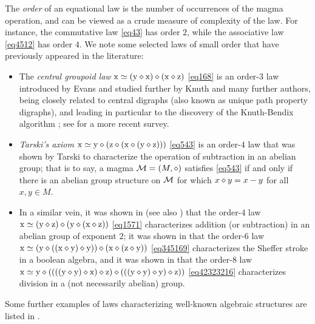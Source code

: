 The \emph{order} of an equational law is the number of occurrences of the magma operation, and can be viewed as a crude measure of complexity of the law. For instance, the commutative law \eqref{eq43} has order $2$, while the associative law \eqref{eq4512} has order $4$. We note some selected laws of small order that have previously appeared in the literature:
\begin{itemize}
\item The \emph{central groupoid law} $\mathrm{x} \simeq (\mathrm{y} \diamond \mathrm{x}) \diamond (\mathrm{x} \diamond \mathrm{z})$ \eqref{eq168} is an order-$3$ law introduced by Evans \cite{evans} and studied further by Knuth \cite{knuth} and many further authors, being closely related to central digraphs (also known as unique path property digraphs), and leading in particular to the discovery of the Knuth-Bendix algorithm \cite{knuth-bendix}; see \cite{klt} for a more recent survey.
\item \emph{Tarski's axiom} $\mathrm{x} \simeq \mathrm{y} \diamond (\mathrm{z} \diamond (\mathrm{x} \diamond (\mathrm{y} \diamond \mathrm{z})))$ \eqref{eq543} is an order-$4$ law that was shown by Tarski \cite{Tarski1938} to characterize the operation of subtraction in an abelian group; that is to say, a magma ${\mathcal{M}} = (M,\diamond)$ satisfies \eqref{eq543} if and only if there is an abelian group structure on ${\mathcal{M}}$ for which $x \diamond y = x-y$ for all $x,y \in M$.
\item In a similar vein, it was shown in \cite{mendelsohn-padmanabhan} (see also \cite{meredith-prior}) that the order-$4$ law
$\mathrm{x} \simeq (\mathrm{y} \diamond \mathrm{z}) \diamond (\mathrm{y} \diamond (\mathrm{x} \diamond \mathrm{z}))$ \eqref{eq1571} characterizes addition (or subtraction) in an abelian group of exponent $2$; it was shown in \cite{mccune_et_al} that the order-$6$ law $\mathrm{x} \simeq (\mathrm{y} \diamond ((\mathrm{x} \diamond \mathrm{y}) \diamond \mathrm{y})) \diamond (\mathrm{x} \diamond (\mathrm{z} \diamond \mathrm{y}))$ \eqref{eq345169} characterizes the Sheffer stroke in a boolean algebra, and it was shown in \cite{higman-neumann} that the order-$8$ law
$\mathrm{x} \simeq \mathrm{y} \diamond ((((\mathrm{y} \diamond \mathrm{y}) \diamond \mathrm{x}) \diamond \mathrm{z}) \diamond (((\mathrm{y} \diamond \mathrm{y}) \diamond \mathrm{y}) \diamond \mathrm{z}))$ \eqref{eq42323216} characterizes division in a (not necessarily abelian) group.
\end{itemize}
Some further examples of laws characterizing well-known algebraic structures are listed in \cite{mccune-survey}.


